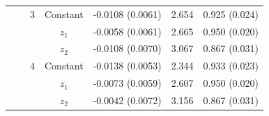 \begin{tabular}{llccccc}
\addlinespace
 &  & 3 & Constant & -0.0108 (0.0061) & 2.654 & 0.925 (0.024) \\
 &  &  & $z_1$ & -0.0058 (0.0061) & 2.665 & 0.950 (0.020) \\
 &  &  & $z_2$ & -0.0108 (0.0070) & 3.067 & 0.867 (0.031) \\
\addlinespace
 &  & 4 & Constant & -0.0138 (0.0053) & 2.344 & 0.933 (0.023) \\
 &  &  & $z_1$ & -0.0073 (0.0059) & 2.607 & 0.950 (0.020) \\
 &  &  & $z_2$ & -0.0042 (0.0072) & 3.156 & 0.867 (0.031) \\
\bottomrule
\end{tabular}
